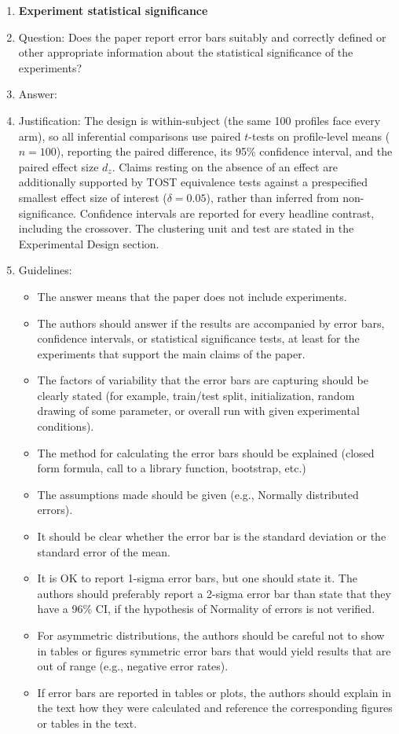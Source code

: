 \begin{enumerate}
\item {\bf Experiment statistical significance}
    \item[] Question: Does the paper report error bars suitably and correctly defined or other appropriate information about the statistical significance of the experiments?
    \item[] Answer: \answerYes{}
    \item[] Justification: The design is within-subject (the same 100 profiles face every arm), so all inferential comparisons use paired $t$-tests on profile-level means ($n{=}100$), reporting the paired difference, its 95\% confidence interval, and the paired effect size $d_z$. Claims resting on the absence of an effect are additionally supported by TOST equivalence tests against a prespecified smallest effect size of interest ($\delta{=}0.05$), rather than inferred from non-significance. Confidence intervals are reported for every headline contrast, including the crossover. The clustering unit and test are stated in the Experimental Design section.
    \item[] Guidelines:
    \begin{itemize}
        \item The answer \answerNA{} means that the paper does not include experiments.
        \item The authors should answer \answerYes{} if the results are accompanied by error bars, confidence intervals, or statistical significance tests, at least for the experiments that support the main claims of the paper.
        \item The factors of variability that the error bars are capturing should be clearly stated (for example, train/test split, initialization, random drawing of some parameter, or overall run with given experimental conditions).
        \item The method for calculating the error bars should be explained (closed form formula, call to a library function, bootstrap, etc.)
        \item The assumptions made should be given (e.g., Normally distributed errors).
        \item It should be clear whether the error bar is the standard deviation or the standard error of the mean.
        \item It is OK to report 1-sigma error bars, but one should state it. The authors should preferably report a 2-sigma error bar than state that they have a 96\% CI, if the hypothesis of Normality of errors is not verified.
        \item For asymmetric distributions, the authors should be careful not to show in tables or figures symmetric error bars that would yield results that are out of range (e.g., negative error rates).
        \item If error bars are reported in tables or plots, the authors should explain in the text how they were calculated and reference the corresponding figures or tables in the text.
    \end{itemize}


\end{enumerate}
